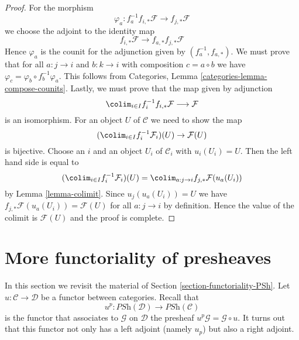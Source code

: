 \begin{proof}
For the morphism
$$
\varphi_a : f_a^{-1}f_{i, *}\mathcal{F} \to f_{j, *}\mathcal{F}
$$
we choose the adjoint to the identity map
$$
f_{i, *}\mathcal{F} \to f_{a, *}f_{j, *}\mathcal{F}
$$
Hence $\varphi_a$ is the counit for the adjunction given by
$(f_a^{-1}, f_{a, *})$. We must prove that for all
$a : j \to i$ and $b : k \to i$ with composition $c = a \circ b$
we have
$\varphi_c = \varphi_b \circ f_b^{-1}\varphi_a$.
This follows from Categories, Lemma \ref{categories-lemma-compose-counits}.
Lastly, we must prove that the map given by adjunction
$$
\colim_{i \in I} f_i^{-1}f_{i, *}\mathcal{F}
\longrightarrow
\mathcal{F}
$$
is an isomorphism. For an object $U$ of $\mathcal{C}$
we need to show the map
$$
(\colim_{i \in I} f_i^{-1}\mathcal{F}_i)(U) \to \mathcal{F}(U)
$$
is bijective. Choose an $i$ and an object $U_i$ of $\mathcal{C}_i$
with $u_i(U_i) = U$. Then the left hand side is equal to
$$
(\colim_{i \in I} f_i^{-1}\mathcal{F}_i)(U) =
\colim_{a : j \to i} f_{j, *}\mathcal{F}(u_a(U_i))
$$
by Lemma \ref{lemma-colimit}. Since $u_j(u_a(U_i)) = U$
we have $f_{j, *}\mathcal{F}(u_a(U_i)) = \mathcal{F}(U)$
for all $a : j \to i$ by definition. Hence the value of the colimit is
$\mathcal{F}(U)$ and the proof is complete.
\end{proof}











\section{More functoriality of presheaves}
\label{section-more-functoriality-PSh}

\noindent
In this section we revisit the material of
Section \ref{section-functoriality-PSh}.
Let $u : \mathcal{C} \to \mathcal{D}$ be a functor between categories.
Recall that
$$
u^p :
\textit{PSh}(\mathcal{D})
\longrightarrow
\textit{PSh}(\mathcal{C})
$$
is the functor that associates to $\mathcal{G}$ on $\mathcal{D}$ the presheaf
$u^p\mathcal{G} = \mathcal{G} \circ u$. It turns out that this functor
not only has a left adjoint (namely $u_p$) but also a right adjoint.

